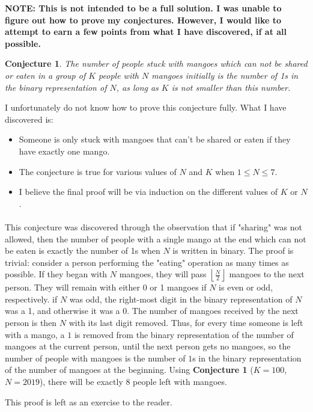 \documentclass[12pt]{article}
\begin{document}
\begin{solution}{4}
    \textbf{NOTE: This is not intended to be a full solution. I was unable to figure out how to prove my conjectures. However, I would like to attempt to earn a few points from what I have discovered, if at all possible.}
    
    \newtheorem{conj}{Conjecture}
    \begin{conj}
        The number of people stuck with mangoes which can not be shared or eaten in a group of
        $K$ people with $N$ mangoes initially is the number of 1s in the binary representation of $N$,
        as long as $K$ is not smaller than this number.
    \end{conj}
    
    I unfortunately do not know how to prove this conjecture fully. What I have discovered is:
    
    \begin{itemize}
        \itemsep 0em
        \item Someone is only stuck with mangoes that can't be shared or eaten if they have exactly one mango.
        \item The conjecture is true for various values of $N$ and $K$ when $1\le N\le 7$.
        \item I believe the final proof will be via induction on the different values of $K$ or $N$.
    \end{itemize}
    
    \paragraph{}
    This conjecture was discovered through the observation that if "sharing" was not allowed, then the number of people
    with a single mango at the end which can not be eaten is exactly the number of 1s when $N$ is written in binary.
    The proof is trivial: consider a person performing the "eating" operation as many times as possible. If they
    began with $N$ mangoes, they will pass $\left\lfloor\frac N2\right\rfloor$ mangoes to the next person. They will remain
    with either 0 or 1 mangoes if $N$ is even or odd, respectively. if $N$ was odd, the right-most digit in the binary representation of $N$ was a 1, and otherwise it was a 0. The number of mangoes received by the next person is then
    $N$ with its last digit removed. Thus, for every time someone is left with a mango, a $1$ is removed from the binary
    representation of the number of mangoes at the current person, until the next person gets no mangoes, so the number
    of people with mangoes is the number of $1$s in the binary representation of the number of mangoes at the beginning.
    \newline
    Using \textbf{Conjecture 1} ($K=100$, $N=2019$), there will be exactly 8 people left with mangoes.
    
\end{solution}

\begin{solution}{5}
    This proof is left as an exercise to the reader. \smiley
\end{solution}
\end{document}
